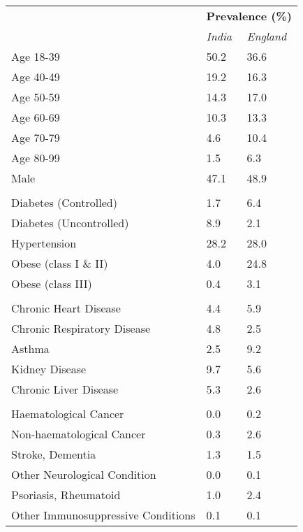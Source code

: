 \begin{tabular}{p{7cm}p{1.1cm}p{1cm}}
& \multicolumn{2}{c}{\textbf{{\footnotesize Prevalence (\%) }}} \\[0.5ex] & \emph{India} & \emph{England} \\[2ex]
Age 18-39 & \num{50.2} & \num{36.6} \\[0.25ex]
Age 40-49 & \num{19.2} & \num{16.3} \\[0.25ex]
Age 50-59 & \num{14.3} & \num{17.0}\\[0.25ex]
Age 60-69 & \num{10.3} & \num{13.3}\\[0.25ex]
Age 70-79 & \num{4.6} & \num{10.4}\\[0.25ex]
Age 80-99 & \num{1.5} & \num{6.3} \\[0.25ex]
Male & \num{47.1} & \num{48.9} \\[0.25ex]
\\
Diabetes (Controlled) & \num{1.7} & \num{6.4} \\[0.25ex]
Diabetes (Uncontrolled) & \num{8.9} & \num{2.1} \\[0.25ex]
Hypertension & \num{28.2} & \num{28.0} \\[0.25ex]
Obese (class I \& II) & \num{4.0} & \num{24.8} \\[0.25ex]
Obese (class III) & \num{0.4} & \num{3.1} \\[0.25ex]
\\
Chronic Heart Disease & \num{4.4} & \num{5.9} \\[0.25ex]
Chronic Respiratory Disease & \num{4.8} & \num{2.5} \\[0.25ex]
Asthma & \num{2.5} & \num{9.2} \\[0.25ex]
Kidney Disease & \num{9.7} & \num{5.6} \\[0.25ex]
Chronic Liver Disease & \num{5.3} & \num{2.6} \\[0.25ex]
\\
Haematological Cancer & \num{0.0} & \num{0.2}\\[0.25ex]
Non-haematological Cancer & \num{0.3} & \num{2.6} \\[0.25ex]
Stroke, Dementia & \num{1.3} & \num{1.5} \\[0.25ex]
Other Neurological Condition & \num{0.0} & \num{0.1} \\[0.25ex]
Psoriasis, Rheumatoid & \num{1.0} & \num{2.4} \\[0.25ex]
Other Immunosuppressive Conditions & \num{0.1} & \num{0.1} \\[0.25ex]
\end{tabular}
